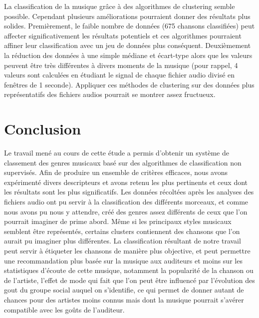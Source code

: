 \documentclass[soumission]{ir}
\begin{document}
La classification de la musique grâce à des algorithmes de clustering semble possible. Cependant plusieurs améliorations 
pourraient donner des résultats plus solides. Premièrement, le faible nombre de données (675 chansons classifiées) 
peut affecter significativement les résultats potentiels et ces algorithmes pourraient affiner leur 
classification avec un jeu de données plus conséquent. Deuxièmement la réduction des données à une simple 
médiane et écart-type alors que les valeurs peuvent être très différentes à divers moments de la musique (pour 
rappel, 4 valeurs sont calculées en étudiant le signal de chaque fichier audio divisé en fenêtres de 1 seconde). 
Appliquer ces méthodes de clustering sur des données plus représentatifs des fichiers audios pourrait se montrer 
assez fructueux.

\section{Conclusion}
Le travail mené au cours de cette étude a permis d’obtenir un système de classement des genres musicaux basé sur 
des algorithmes de classification non supervisés. Afin de produire un ensemble de critères efficaces, nous avons 
expérimenté divers descripteurs et avons retenu les plus pertinents et ceux dont les résultats sont les plus 
significatifs.  Les données récoltées après les analyses des fichiers audio ont pu servir à la classification des 
différents morceaux, et comme nous avons pu nous y attendre, créé des genres assez différents de ceux que l’on 
pourrait imaginer de prime abord. Même si les principaux styles musicaux semblent être représentés, certains 
clusters contiennent des chansons que l’on aurait pu imaginer plus différentes. La classification résultant de 
notre travail peut servir à étiqueter les chansons de manière plus objective, et peut permettre une 
recommandation plus basée sur la musique aux auditeurs et moins sur les statistiques d’écoute de cette musique, 
notamment la popularité de la chanson ou de l’artiste, l’effet de mode qui fait que l’on peut être influencé par 
l’évolution des gout du groupe social auquel on s’identifie, ce qui permet de donner autant de chances pour des 
artistes moins connus mais dont la musique pourrait s’avérer compatible avec les goûts de l’auditeur.




\appendix
\end{document}
